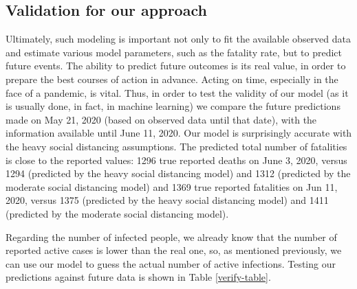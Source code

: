 \documentclass[11pt]{article}
\begin{document}
\subsection{Validation for our approach}

Ultimately, such modeling is important not only to fit the available observed data and estimate various model parameters, such as the fatality rate, but to predict future events. The ability to predict future outcomes is its real value, in order to prepare the best courses of action in advance. Acting on time, especially in the face of a pandemic, is vital. Thus, in order to test the validity of our model (as it is usually done, in fact, in machine learning) we compare the future predictions made on May 21, 2020 (based on observed data until that date), with the information available until June 11, 2020. Our model is surprisingly accurate with the heavy social distancing assumptions. The predicted total number of fatalities is close to the reported values: 1296 true reported deaths on June 3, 2020, versus 1294 (predicted by the heavy social distancing model) and 1312 (predicted by the moderate social distancing model) and 1369 true reported fatalities on Jun 11, 2020, versus 1375 (predicted by the heavy social distancing model) and 1411 (predicted by the moderate social distancing model).

Regarding the number of infected people, we already know that the number of reported active cases is lower than the real one, so, as mentioned previously, we can use our model to guess the actual number of active infections. Testing our predictions against future data is shown in Table \ref{verify-table}.
\end{document}
